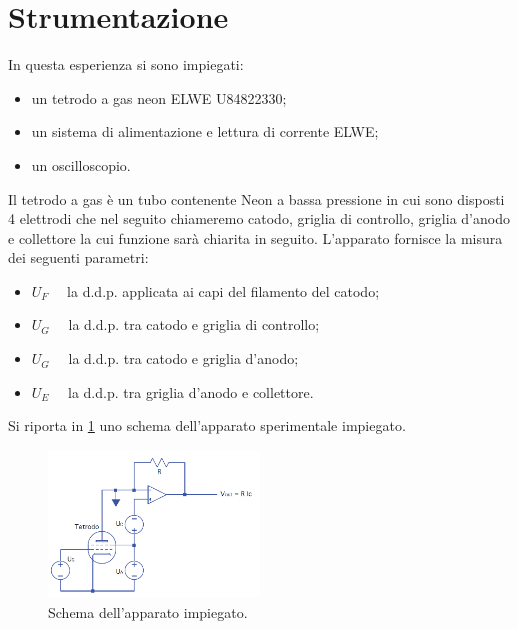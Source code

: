 \section{Strumentazione}
	In questa esperienza si sono impiegati:	
	\begin{itemize}
	\item un tetrodo a gas neon ELWE U84822330;
	\item un sistema di alimentazione e 
		lettura di corrente ELWE;
	\item un oscilloscopio.
	\end{itemize}

Il tetrodo a gas è un tubo contenente Neon a bassa pressione in cui sono disposti 4 elettrodi che nel seguito chiameremo catodo, griglia di controllo, griglia d'anodo e collettore la cui funzione sarà chiarita in seguito.
L'apparato fornisce la misura dei seguenti parametri:
\begin{itemize}
	\item $U_F\quad$	la d.d.p. applicata ai capi del filamento del catodo;
	\item $U_G\quad$	la d.d.p. tra catodo e griglia di controllo;
	\item $U_G\quad$	la d.d.p. tra catodo e griglia d'anodo;
	\item $U_E\quad$	la d.d.p. tra griglia d'anodo e collettore.
\end{itemize}

Si riporta in \figurename{ \ref{fig:apparato}} uno schema 
	dell'apparato sperimentale impiegato. 
	\begin{figure} [!h]
		\centering
		\includegraphics[width=0.5\textwidth]{../Figs-tabs/apparato.png}
		\caption{Schema dell'apparato impiegato.}
		\label{fig:apparato}
	\end{figure}

	

	